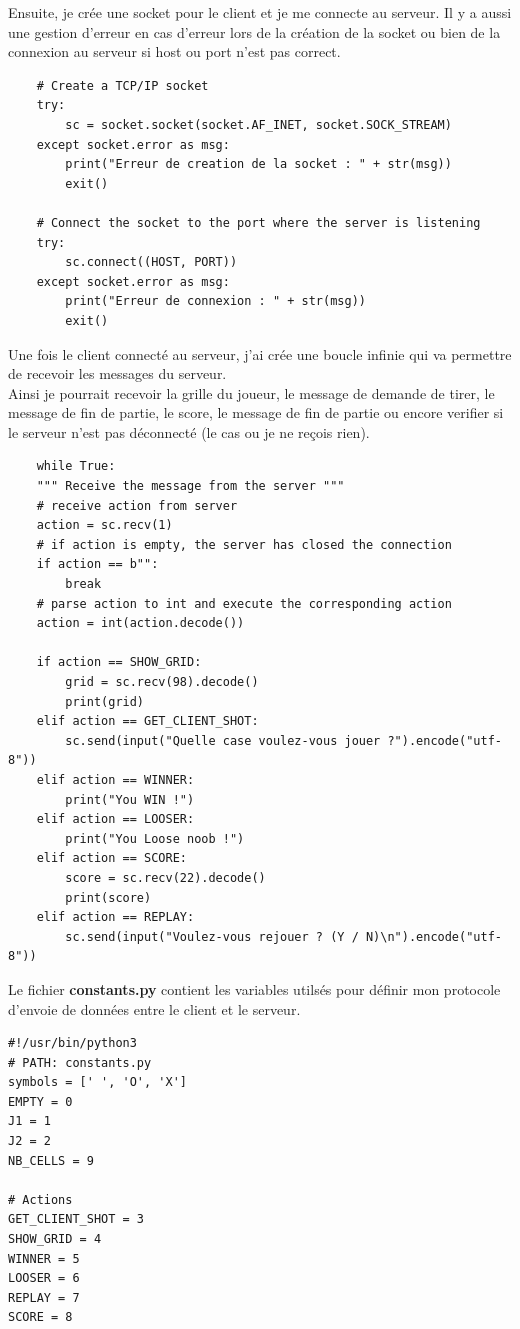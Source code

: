 \documentclass{article}
\begin{document}
Ensuite, je crée une socket pour le client et je me connecte au serveur. Il y a aussi une gestion d'erreur en cas d'erreur lors de la création de la socket ou bien de la connexion au serveur si host ou port n'est pas correct.\\
\begin{lstlisting}
    # Create a TCP/IP socket
    try:
        sc = socket.socket(socket.AF_INET, socket.SOCK_STREAM)
    except socket.error as msg:
        print("Erreur de creation de la socket : " + str(msg))
        exit()
    
    # Connect the socket to the port where the server is listening
    try:
        sc.connect((HOST, PORT))
    except socket.error as msg:
        print("Erreur de connexion : " + str(msg))
        exit()
\end{lstlisting}
Une fois le client connecté au serveur, j'ai crée une boucle infinie qui va permettre de recevoir les messages du serveur.\\
Ainsi je pourrait recevoir la grille du joueur, le message de demande de tirer, le message de fin de partie, le score, le message de fin de partie ou encore verifier si le serveur n'est pas déconnecté (le cas ou je ne reçois rien).\\
\begin{lstlisting}
    while True:
    """ Receive the message from the server """
    # receive action from server
    action = sc.recv(1)
    # if action is empty, the server has closed the connection
    if action == b"":
        break
    # parse action to int and execute the corresponding action
    action = int(action.decode())

    if action == SHOW_GRID:
        grid = sc.recv(98).decode()
        print(grid)
    elif action == GET_CLIENT_SHOT:
        sc.send(input("Quelle case voulez-vous jouer ?").encode("utf-8"))
    elif action == WINNER:
        print("You WIN !")
    elif action == LOOSER:
        print("You Loose noob !")
    elif action == SCORE:
        score = sc.recv(22).decode()
        print(score)
    elif action == REPLAY:
        sc.send(input("Voulez-vous rejouer ? (Y / N)\n").encode("utf-8"))
\end{lstlisting}
Le fichier \textbf{constants.py} contient les variables utilsés pour définir mon protocole d'envoie de données entre le client et le serveur.\\
\begin{lstlisting}
#!/usr/bin/python3
# PATH: constants.py
symbols = [' ', 'O', 'X']
EMPTY = 0
J1 = 1
J2 = 2
NB_CELLS = 9

# Actions
GET_CLIENT_SHOT = 3
SHOW_GRID = 4
WINNER = 5
LOOSER = 6
REPLAY = 7
SCORE = 8
\end{lstlisting}
\end{document}
